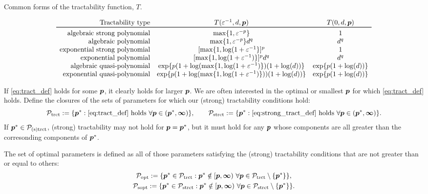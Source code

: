 \documentclass[sort&compress]{elsarticle}
\begin{document}
\begin{table}
    \caption{Common forms of the tractability function, $T$.}
{\small
\begin{equation*}
	\begin{array}{r@{\quad}c@{\quad}cc}
		\text{Tractability type} & T(\varepsilon^{-1},d,\vp)
		& T(0,d,\vp)\\
		\toprule
		\text{algebraic strong polynomial} & \max\{1,\varepsilon^{-p}\} & 1\\
		\text{algebraic polynomial} & \max\{1,\varepsilon^{-p}\}d^{q} & d^{q}\\
		\text{exponential strong polynomial} &  [\max\{1,\log(1 + \varepsilon^{-1}\}]^p & 1\\
		\text{exponential polynomial} &
		[\max\{1,\log(1 + \varepsilon^{-1})\}]^p  d^{q} & d^{q} \\
        \text{algebraic quasi-polynomial} &
        \exp\{p(1+\log(\max\{1,\log(1 + \varepsilon^{-1})\})(1+\log(d))\} &
        \exp\{p(1+\log(d))\}\\
        \text{exponential quasi-polynomial} &
        \exp\{p(1+\log(\max\{1,\log(1+\varepsilon^{-1})\}))(1+\log(d))\} &
        \exp\{p(1+\log(d))\}
	\end{array}
\end{equation*}}
\label{tab:commonT}
\end{table}

If \eqref{eq:tract_def} holds for some $\boldsymbol{p}$, it clearly holds for larger $\boldsymbol{p}$.  We are often interested in the optimal or smallest $\boldsymbol{p}$ for which \eqref{eq:tract_def} holds.  Define the closures of the sets of parameters for which our (strong) tractability conditions hold:
\begin{equation*}
	\mathcal{P}_{\textup{trct}} : = \{\boldsymbol{p}^* : \eqref{eq:tract_def} \text{ holds }\forall \boldsymbol{p} \in (\boldsymbol{p}^*,\boldsymbol{\infty})\}, \qquad
	\mathcal{P}_{\textup{strct}} : = \{\boldsymbol{p}^* : \eqref{eq:strong_tract_def} \text{ holds }\forall \boldsymbol{p} \in (\boldsymbol{p}^*,\boldsymbol{\infty})\}.
\end{equation*}
If $\boldsymbol{p}^* \in \mathcal{P}_{\textup{(s)trct}}$, (strong) tractability may not hold for $\boldsymbol{p} = \boldsymbol{p}^*$, but it must hold for any $\boldsymbol{p}$ whose components are all greater than the corresonding components of $\boldsymbol{p}^*$.

\begin{definition}
    The  set of optimal parameters is defined as all of those parameters satisfying the (strong) tractability conditions that are not greater than or equal to others:
\begin{gather}
	\label{eq:Poptdef}
	\mathcal{P}_{\textup{opt}} : = \{\boldsymbol{p}^* \in \mathcal{P}_{\textup{trct}} :  \boldsymbol{p}^* \notin [\boldsymbol{p},\boldsymbol{\infty}) \ \forall \boldsymbol{p} \in  \mathcal{P}_{\textup{trct}} \setminus \{\boldsymbol{p}^*\} \}, \\
	\label{eq:Psoptdef}
	\mathcal{P}_{\textup{sopt}} : = \{\boldsymbol{p}^* \in \mathcal{P}_{\textup{strct}} :  \boldsymbol{p}^* \notin [\boldsymbol{p},\boldsymbol{\infty}) \ \forall \boldsymbol{p} \in  \mathcal{P}_{\textup{strct}} \setminus \{\boldsymbol{p}^*\} \}.
\end{gather}
\end{definition}
\end{document}
